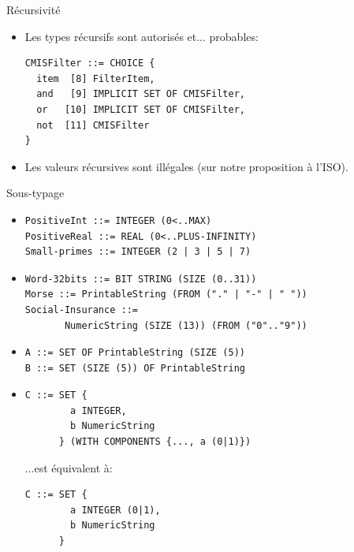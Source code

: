 \begin{slide}
\begin{block} {Récursivité} \end{block}
\begin{itemize}
  \item Les types récursifs sont autorisés et... probables:
\begin{verbatim}
CMISFilter ::= CHOICE {
  item  [8] FilterItem,
  and   [9] IMPLICIT SET OF CMISFilter,
  or   [10] IMPLICIT SET OF CMISFilter,
  not  [11] CMISFilter
}
\end{verbatim}

  \item Les valeurs récursives sont illégales (sur notre proposition à
        l'ISO).
\end{itemize}
\end{slide}

\begin{slide}
\begin{block} {Sous-typage} \end{block}

\begin{itemize}

  \item
\begin{verbatim}
PositiveInt ::= INTEGER (0<..MAX)
PositiveReal ::= REAL (0<..PLUS-INFINITY)
Small-primes ::= INTEGER (2 | 3 | 5 | 7)
\end{verbatim}

\item
\begin{verbatim}
Word-32bits ::= BIT STRING (SIZE (0..31))
Morse ::= PrintableString (FROM ("." | "-" | " "))
Social-Insurance ::=
       NumericString (SIZE (13)) (FROM ("0".."9"))
\end{verbatim}

  \item
\begin{verbatim}
A ::= SET OF PrintableString (SIZE (5))
B ::= SET (SIZE (5)) OF PrintableString
\end{verbatim}
\end{itemize}

\continued

\begin{itemize}

  \item
\begin{verbatim}
C ::= SET {
        a INTEGER,
        b NumericString
      } (WITH COMPONENTS {..., a (0|1)})
\end{verbatim}

...est équivalent à:

\begin{verbatim}
C ::= SET {
        a INTEGER (0|1),
        b NumericString
      }
\end{verbatim}

\end{itemize}

\end{slide}
